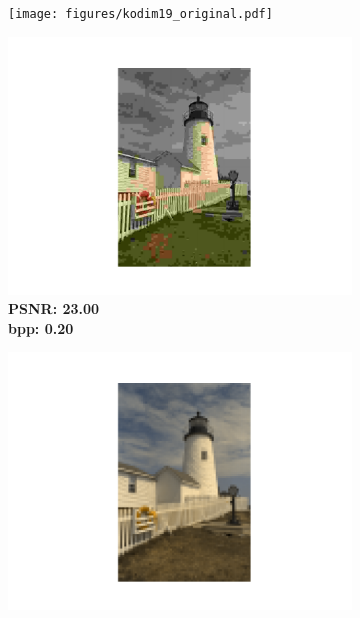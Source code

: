 \begin{figure}[t]
	\centering
	\begin{subfigure}{.19\textwidth}
		\centering
		\texttt{[image: figures/kodim19\_original.pdf]}
        \vspace{-6pt}
        \caption*{\tiny}
	\end{subfigure}%
	\begin{subfigure}{.19\textwidth}
		\centering
		\includegraphics[trim=5cm 1.5cm 5cm 1.7cm, clip, width=1\textwidth]{figures/kodim19_JPEG_bpp_0.202.pdf}
        \vspace{-15pt}
        \caption*{\tiny \textbf{PSNR: 23.00 \\ bpp: 0.20}}
	\end{subfigure}
    \begin{subfigure}{.19\textwidth}
		\centering
		\includegraphics[trim=5cm 1.5cm 5cm 1.7cm, clip, width=1\textwidth]{figures/kodim19_SVD_bpp_0.215.pdf}

\end{subfigure}
\end{figure}
